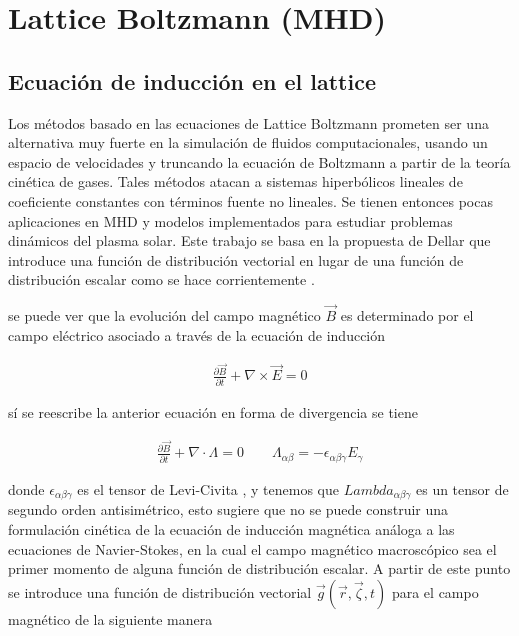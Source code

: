 \chapter{Lattice Boltzmann (MHD)}


\section{Ecuación de inducción en el lattice}

\noindent Los métodos basado en las ecuaciones de Lattice Boltzmann prometen ser una alternativa muy fuerte en la simulación de fluidos computacionales, usando un espacio de velocidades y truncando la ecuación de Boltzmann a partir de la teoría cinética de gases. Tales métodos atacan a sistemas hiperbólicos lineales de coeficiente constantes con términos fuente no lineales. Se tienen entonces pocas aplicaciones en MHD y modelos implementados para estudiar problemas dinámicos del plasma solar. Este trabajo se basa en la propuesta de Dellar \cite{Dellar} que introduce una función de distribución vectorial en lugar de una función de distribución escalar como se hace corrientemente \cite{kruger}.  

\noindent se puede ver que la evolución del campo magnético $\vec{B}$ es determinado por el campo eléctrico asociado a través de la ecuación de inducción

\begin{eqnarray}
    \frac{\partial \vec{B}}{\partial t} + \nabla \times \vec{E} = 0 \nonumber 
\end{eqnarray}

\noindent sí se reescribe la anterior ecuación en forma de divergencia se tiene 

\begin{eqnarray}
    \frac{\partial \vec{B}}{\partial t} + \nabla\cdot\Lambda = 0 \qquad \Lambda_{\alpha\beta}=-\epsilon_{\alpha\beta\gamma}E_{\gamma}
\end{eqnarray}

\noindent donde $\epsilon_{\alpha\beta\gamma}$ es el tensor  de Levi-Civita , y tenemos que $Lambda_{\alpha\beta\gamma}$ es un tensor de segundo orden antisimétrico, esto sugiere que no se puede construir una formulación cinética de la ecuación de inducción magnética análoga a las ecuaciones de Navier-Stokes, en la cual el campo magnético macroscópico sea el primer momento de alguna función de distribución escalar. A partir de este punto se introduce una función de distribución vectorial $\vec{g}(\vec{r},\vec{\zeta},t)$ para el campo magnético de la siguiente manera

